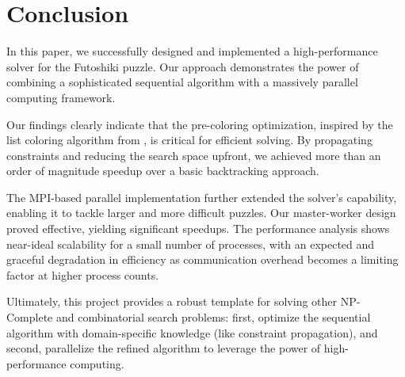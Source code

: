 \section{Conclusion}
In this paper, we successfully designed and implemented a high-performance solver for the Futoshiki puzzle. Our approach demonstrates the power of combining a sophisticated sequential algorithm with a massively parallel computing framework.

Our findings clearly indicate that the pre-coloring optimization, inspired by the list coloring algorithm from \cite{Sen2024Futoshiki}, is critical for efficient solving. By propagating constraints and reducing the search space upfront, we achieved more than an order of magnitude speedup over a basic backtracking approach.

The MPI-based parallel implementation further extended the solver's capability, enabling it to tackle larger and more difficult puzzles. Our master-worker design proved effective, yielding significant speedups. The performance analysis shows near-ideal scalability for a small number of processes, with an expected and graceful degradation in efficiency as communication overhead becomes a limiting factor at higher process counts.

Ultimately, this project provides a robust template for solving other NP-Complete and combinatorial search problems: first, optimize the sequential algorithm with domain-specific knowledge (like constraint propagation), and second, parallelize the refined algorithm to leverage the power of high-performance computing.